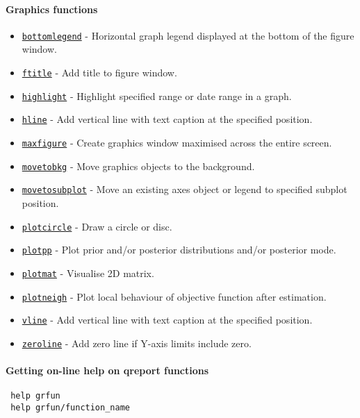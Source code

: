 

	\paragraph{Graphics functions}
 
 \begin{itemize}
 \item
   \href{grfun/bottomlegend}{\texttt{bottomlegend}} - Horizontal graph
   legend displayed at the bottom of the figure window.
 \item
   \href{grfun/ftitle}{\texttt{ftitle}} - Add title to figure window.
 \item
   \href{grfun/highlight}{\texttt{highlight}} - Highlight specified range
   or date range in a graph.
 \item
   \href{grfun/hline}{\texttt{hline}} - Add vertical line with text
   caption at the specified position.
 \item
   \href{grfun/maxfigure}{\texttt{maxfigure}} - Create graphics window
   maximised across the entire screen.
 \item
   \href{grfun/movetobkg}{\texttt{movetobkg}} - Move graphics objects to
   the background.
 \item
   \href{grfun/movetosubplot}{\texttt{movetosubplot}} - Move an existing
   axes object or legend to specified subplot position.
 \item
   \href{grfun/plotcircle}{\texttt{plotcircle}} - Draw a circle or disc.
 \item
   \href{grfun/plotpp}{\texttt{plotpp}} - Plot prior and/or posterior
   distributions and/or posterior mode.
 \item
   \href{grfun/plotmat}{\texttt{plotmat}} - Visualise 2D matrix.
 \item
   \href{grfun/plotneigh}{\texttt{plotneigh}} - Plot local behaviour of
   objective function after estimation.
 \item
   \href{grfun/vline}{\texttt{vline}} - Add vertical line with text
   caption at the specified position.
 \item
   \href{grfun/zeroline}{\texttt{zeroline}} - Add zero line if Y-axis
   limits include zero.
 \end{itemize}
 
 \paragraph{Getting on-line help on qreport functions}
 
 \begin{verbatim}
 help grfun
 help grfun/function_name
 \end{verbatim}



